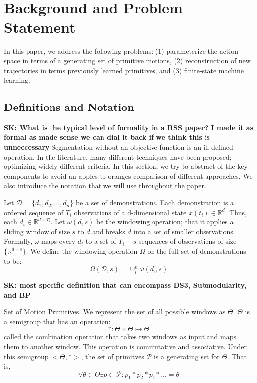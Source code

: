 \section{Background and Problem Statement}
In this paper, we address the following problems: (1) parameterize the action space in terms of a generating set of primitive motions, (2) reconstruction of new trajectories in terms previously learned primitives, and (3) finite-state machine learning.
\subsection{Definitions and Notation}
\textbf{SK: What is the typical level of formality in a RSS paper? I made it as formal as made sense we can dial it back if we think this is unneccessary}
Segmentation without an objective function is an ill-defined operation. 
In the literature, many different techniques have been proposed; optimizing widely different criteria.
In this section, we try to abstract of the key components to avoid an apples to oranges comparison of different approaches.
We also introduce the notation that we will use throughout the paper.

Let $\mathcal{D}=\{d_1,d_2,...,d_n\}$ be a set of demonstrations.
Each demonstration is a ordered sequence of $T_i$ observations of a d-dimensional state $x( t_i ) \in \mathbb{R}^d $.
Thus, each $d_i\in \mathbb{R}^{d \times T_i}$.
Let $\omega(d,s)$ be the windowing operation; that it applies a sliding window  of size $s$ to $d$ and breaks $d$ into a set of smaller observations.
Formally, $\omega$ maps every $d_i$ to a set of $T_i-s$ sequences of observations of size $\{ \mathbb{R}^{d \times s} \}$.
We define the windowing operation $\Omega$ on the full set of demonstrations to be:
\[\Omega(\mathcal{D},s) = \cup_i^n \omega(d_i,s)\]

\textbf{SK: most specific definition that can encompass DS3, Submodularity, and BP}
\begin{definition} Set of Motion Primitives. 
We represent the set of all possible windows as $\Theta$.
$\Theta$ is a semigroup that has an operation:
\[*:\Theta \times \Theta \mapsto \Theta \]
called the combination operation that takes two windows as input and maps them to another window.
This operation is commutative and associative.
Under this semigroup $<\Theta,*>$, the set of primitves $\mathcal{P}$ is 
a generating set for $\Theta$.
That is, \[\forall \theta \in \Theta \exists p \subset \mathcal{P}: p_1*p_2*p_3*... = \theta\]
\end{definition}

